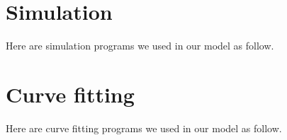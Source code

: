 \section* {Simulation}
Here are simulation programs we used in our model as follow.

















\section*{Curve fitting}
Here are curve fitting programs we used in our model as follow.


